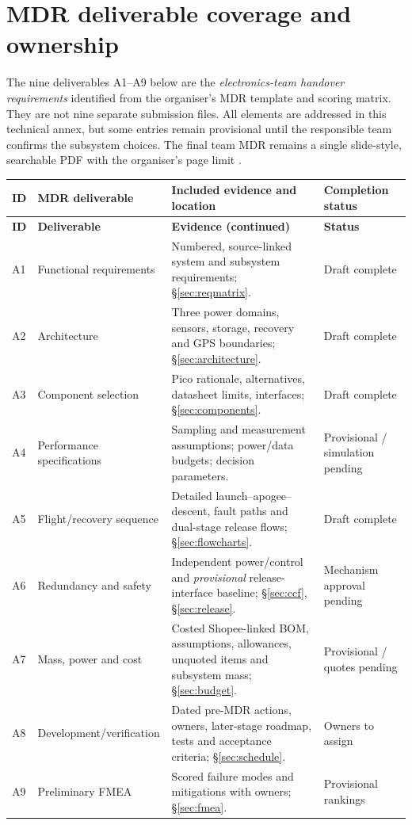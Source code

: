 
\section{MDR deliverable coverage and ownership}
\label{sec:mdrcoverage}
The nine deliverables A1--A9 below are the \emph{electronics-team handover requirements} identified from the organiser's MDR template and scoring matrix. They are not nine separate submission files. All elements are addressed in this technical annex, but some entries remain provisional until the responsible team confirms the subsystem choices. The final team MDR remains a single slide-style, searchable PDF with the organiser's page limit \cite{rtc2027app01,rtc2027app07}.

\small
{}
\begin{longtable}{@{}L{11mm}L{38mm}L{76mm}L{27mm}@{}}
\toprule{}\textbf{ID}&\textbf{MDR deliverable}&\textbf{Included evidence and location}&\textbf{Completion status}\\\midrule\endfirsthead
\toprule{}\textbf{ID}&\textbf{Deliverable}&\textbf{Evidence (continued)}&\textbf{Status}\\\midrule\endhead
\bottomrule\endlastfoot
A1 & Functional requirements & Numbered, source-linked system and subsystem requirements; \S\ref{sec:reqmatrix}. & Draft complete\\
A2 & Architecture & Three power domains, sensors, storage, recovery and GPS boundaries; \S\ref{sec:architecture}. & Draft complete\\
A3 & Component selection & Pico rationale, alternatives, datasheet limits, interfaces; \S\ref{sec:components}. & Draft complete\\
A4 & Performance specifications & Sampling and measurement assumptions; power/data budgets; decision parameters. & Provisional / simulation pending\\
A5 & Flight/recovery sequence & Detailed launch--apogee--descent, fault paths and dual-stage release flows; \S\ref{sec:flowcharts}. & Draft complete\\
A6 & Redundancy and safety & Independent power/control and \emph{provisional} release-interface baseline; \S\ref{sec:ccf}, \S\ref{sec:release}. & Mechanism approval pending\\
A7 & Mass, power and cost & Costed Shopee-linked BOM, assumptions, allowances, unquoted items and subsystem mass; \S\ref{sec:budget}. & Provisional / quotes pending\\
A8 & Development/verification & Dated pre-MDR actions, owners, later-stage roadmap, tests and acceptance criteria; \S\ref{sec:schedule}. & Owners to assign\\
A9 & Preliminary FMEA & Scored failure modes and mitigations with owners; \S\ref{sec:fmea}. & Provisional rankings\\
\end{longtable}
\normalsize

